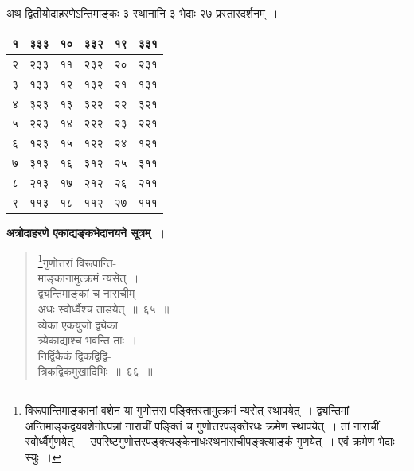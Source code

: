 \documentclass[11pt, openany]{book}
\begin{document}
\newpage

अथ द्वितीयोदाहरणेऽन्तिमाङ्कः ३ स्थानानि ३ भेदाः २७ प्रस्तारदर्शनम्~।

\begin{table}[h]
\centering
\begin{tabular}{|c|c|c|c|c|c|}
	\hline
{\hbox{१}} & {\hbox{३३३}} & {\hbox{१०}} & {\hbox{३३२}} & {\hbox{१९}} & {\hbox{३३१}}\\
\hline 
{\hbox{२}} & {\hbox{२३३}} & {\hbox{११}} & {\hbox{२३२}} & {\hbox{२०}} & {\hbox{२३१}}\\
\hline 
{\hbox{३}} & {\hbox{१३३}} & {\hbox{१२}} & {\hbox{१३२}} & {\hbox{२१}} & {\hbox{१३१}}\\
\hline 
{\hbox{४}} & {\hbox{३२३}} & {\hbox{१३}} & {\hbox{३२२}} & {\hbox{२२}} & {\hbox{३२१}}\\
\hline 
{\hbox{५}} & {\hbox{२२३}} & {\hbox{१४}} & {\hbox{२२२}} & {\hbox{२३}} & {\hbox{२२१}}\\
\hline 
{\hbox{६}} & {\hbox{१२३}} & {\hbox{१५}} & {\hbox{१२२}} & {\hbox{२४}} & {\hbox{१२१}}\\
\hline
{\hbox{७}} & {\hbox{३१३}} & {\hbox{१६}} & {\hbox{३१२}} & {\hbox{२५}} & {\hbox{३११}}\\
\hline
{\hbox{८}} & {\hbox{२१३}} & {\hbox{१७}} & {\hbox{२१२}} & {\hbox{२६}} & {\hbox{२११}}\\
\hline
 {\hbox{९}} & {\hbox{११३}} & {\hbox{१८}} & {\hbox{११२}} & {\hbox{२७}} & {\hbox{१११}}\\
 \hline
\end{tabular}	
\end{table}
\vspace{2mm}

\textbf{अत्रोदाहरणे एकाद्यङ्कभेदानयने सूत्रम्~।}
\begin{quote}

\renewcommand{\thefootnote}{१}\footnote{विरूपान्तिमाङ्कानां वशेन या गुणोत्तरा पङ्क्तिस्तामुत्क्रमं न्यसेत् स्थापयेत्~। द्व्यन्तिमां अन्तिमाङ्कद्वयवशेनोत्पन्नां नाराचीं पङ्क्तिं च गुणोत्तरपङ्क्तेरधः क्रमेण स्थापयेत्~। तां नाराचीं स्वोर्ध्वैर्गुणयेत्~। उपरिष्टगुणोत्तरपङ्क्त्यङ्केनाधःस्थनाराचीपङ्क्त्याङ्कं गुणयेत्~। एवं क्रमेण भेदाः स्युः~।}{\gk गुणोत्तरां विरूपान्ति-\\
माङ्कानामुत्क्रमं न्यसेत्~।\\
द्व्यन्तिमाङ्कां च नाराचीम्\\
अधः स्वोर्ध्वैश्च ताडयेत्~॥~६५~॥\\
व्येका एकयुजो द्व्येका\\
त्र्येकाद्याश्च भवन्ति ताः~।\\
निर्द्विकैकं द्विकद्विद्वि-\\
त्रिकद्विकमुखादिभिः~॥~६६~॥}
\end{quote}
\end{document}
